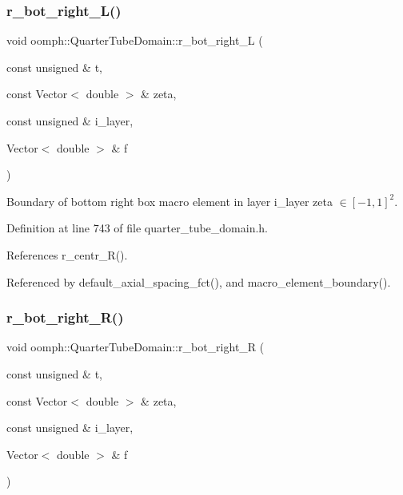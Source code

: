 \mbox{\label{classoomph_1_1QuarterTubeDomain_a1c28597fc3361c177620ed914d1731ac}} 
\subsubsection{\texorpdfstring{r\+\_\+bot\+\_\+right\+\_\+\+L()}{r\_bot\_right\_L()}}
{\footnotesize\ttfamily void oomph\+::\+Quarter\+Tube\+Domain\+::r\+\_\+bot\+\_\+right\+\_\+L (\begin{DoxyParamCaption}\item[{const unsigned \&}]{t,  }\item[{const Vector$<$ double $>$ \&}]{zeta,  }\item[{const unsigned \&}]{i\+\_\+layer,  }\item[{Vector$<$ double $>$ \&}]{f }\end{DoxyParamCaption})\hspace{0.3cm}{\ttfamily [private]}}



Boundary of bottom right box macro element in layer i\+\_\+layer zeta $ \in [-1,1]^2 $. 



Definition at line 743 of file quarter\+\_\+tube\+\_\+domain.\+h.



References r\+\_\+centr\+\_\+\+R().



Referenced by default\+\_\+axial\+\_\+spacing\+\_\+fct(), and macro\+\_\+element\+\_\+boundary().

\mbox{\label{classoomph_1_1QuarterTubeDomain_ac269033d05cfc31f78ef6c555723ba3e}} 
\subsubsection{\texorpdfstring{r\+\_\+bot\+\_\+right\+\_\+\+R()}{r\_bot\_right\_R()}}
{\footnotesize\ttfamily void oomph\+::\+Quarter\+Tube\+Domain\+::r\+\_\+bot\+\_\+right\+\_\+R (\begin{DoxyParamCaption}\item[{const unsigned \&}]{t,  }\item[{const Vector$<$ double $>$ \&}]{zeta,  }\item[{const unsigned \&}]{i\+\_\+layer,  }\item[{Vector$<$ double $>$ \&}]{f }\end{DoxyParamCaption})\hspace{0.3cm}{\ttfamily [private]}}



